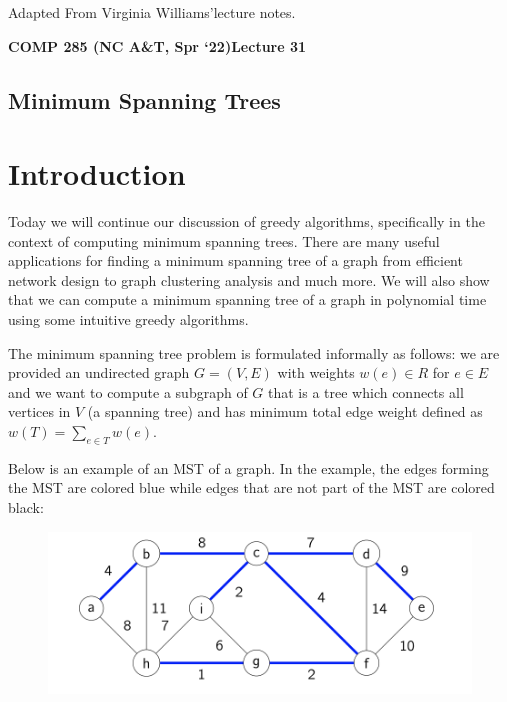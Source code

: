 \documentclass [12pt]{article}
\theoremstyle{definition}
\begin{document}
 

\vspace {1em} 
\begin {Instruction} 
Adapted From Virginia Williams'lecture notes.
\end {Instruction}  

{\LARGE \textbf {COMP 285 (NC A\&T, Spr `22)}\hfill \textbf {Lecture 31} } 

\begin{centering}
\section*{Minimum Spanning Trees}
\end{centering}

\section{Introduction}

Today we will continue our discussion of greedy algorithms, specifically in the context of computing minimum spanning trees. There are many useful applications for finding a minimum spanning tree of a graph from efficient network design to graph clustering analysis and
much more. We will also show that we can compute a minimum spanning tree of a graph in
polynomial time using some intuitive greedy algorithms.
 
The minimum spanning tree problem is formulated informally as follows: we are provided an undirected graph $G = (V, E)$ with weights $w(e) \in R$ for $e \in E$ and we want to compute a subgraph of $G$ that is a tree which connects all vertices in $V$ (a spanning tree) and has minimum total edge weight defined as $w(T) = \sum_{e\in T} w(e)$.

Below is an example of an MST of a graph. In the example, the edges forming the MST are colored blue while edges that are not part of the MST are colored black:


\begin{figure}[h!]
\centering
\includegraphics[scale=0.5]{mst_example.png}
\end{figure}
\end{document}
